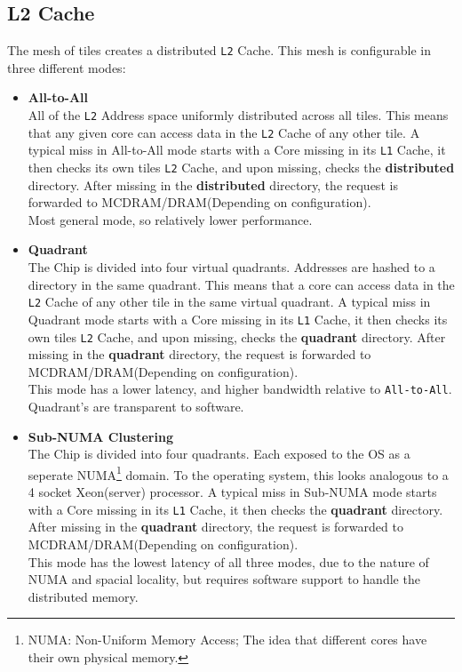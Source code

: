 \documentclass[bsc,frontabs,twoside,singlespacing,parskip,deptreport]{infthesis}     %
\begin{document}
\subsection{L2 Cache}
The mesh of tiles creates a distributed \texttt{L2} Cache. This mesh is configurable in three different modes:
\begin{itemize}

    \item \textbf{All-to-All} \\
    All of the \texttt{L2} Address space uniformly distributed across all tiles. This means that any given core can access data in the \texttt{L2} Cache of any other tile. A typical miss in All-to-All mode starts with a Core missing in its \texttt{L1} Cache, it then checks its own tiles \texttt{L2} Cache, and upon missing, checks the \textbf{distributed} directory. After missing in the \textbf{distributed} directory, the request is forwarded to MCDRAM/DRAM(Depending on configuration).\\
    Most general mode, so relatively lower performance.
    
    \item \textbf{Quadrant} \\
    The Chip is divided into four virtual quadrants. Addresses are hashed to a directory in the same quadrant. This means that a core can access data in the \texttt{L2} Cache of any other tile in the same virtual quadrant. A typical miss in Quadrant mode starts with a Core missing in its \texttt{L1} Cache, it then checks its own tiles \texttt{L2} Cache, and upon missing, checks the \textbf{quadrant} directory. After missing in the \textbf{quadrant} directory, the request is forwarded to MCDRAM/DRAM(Depending on configuration).\\
    This mode has a lower latency, and higher bandwidth relative to \texttt{All-to-All}. Quadrant's are transparent to software.
    
    \item \textbf{Sub-NUMA Clustering} \\
    The Chip is divided into four quadrants. Each exposed to the OS as a seperate NUMA\footnote{NUMA: Non-Uniform Memory Access; The idea that different cores have their own physical memory.} domain. To the operating system, this looks analogous to a 4 socket Xeon(server) processor. A typical miss in Sub-NUMA mode starts with a Core missing in its \texttt{L1} Cache, it then checks the \textbf{quadrant} directory. After missing in the \textbf{quadrant} directory, the request is forwarded to MCDRAM/DRAM(Depending on configuration). \\
    This mode has the lowest latency of all three modes, due to the nature of NUMA and spacial locality, but requires software support to handle the distributed memory.
    
\end{itemize}
\end{document}
